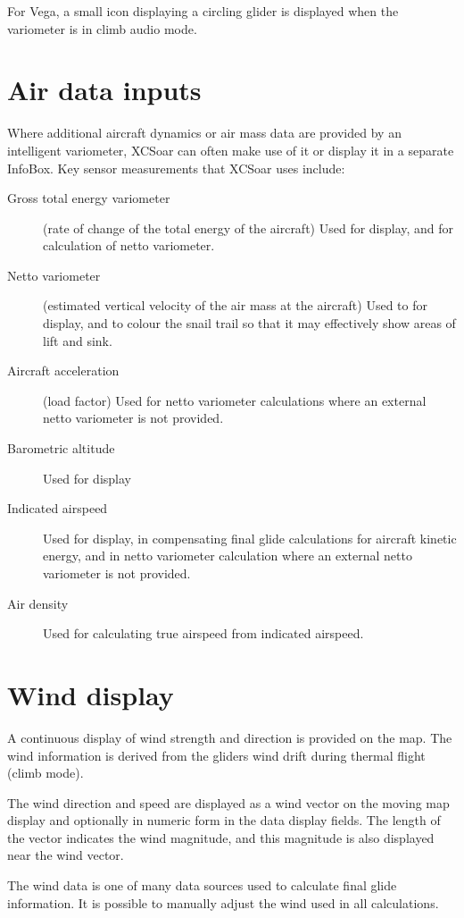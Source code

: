 \documentclass[a4paper,12pt]{refrep}
\begin{document}
For Vega, a small icon displaying a circling glider is displayed when
the variometer is in climb audio mode.

\section{Air data inputs}

Where additional aircraft dynamics or air mass data are provided by an
intelligent variometer, XCSoar can often make use of it or display it
in a separate InfoBox.  Key sensor measurements that XCSoar uses include:
\begin{description}
\item[Gross total energy variometer] (rate of change of the total energy of
 the aircraft)  Used for display, and for calculation of netto variometer.
\item[Netto variometer] (estimated vertical velocity of the air mass at
 the aircraft)  Used to for display, and to colour the snail trail
 so that it may effectively show areas of lift and sink.
\item[Aircraft acceleration] (load factor)  Used for netto variometer
  calculations where an external netto variometer is not provided.
\item[Barometric altitude] Used for display
\item[Indicated airspeed] Used for display, in compensating final glide
  calculations for aircraft kinetic energy, and in netto variometer
  calculation where an external netto variometer is not provided.
\item[Air density] Used for calculating true airspeed from indicated
  airspeed.
\end{description}

\section{Wind display}

A continuous display of wind strength and direction is provided on the
map.  The wind information is derived from the gliders wind drift
during thermal flight (climb mode).

The wind direction and speed are displayed as a wind vector on the
moving map display and optionally in numeric form in the data display
fields.  The length of the vector indicates the wind magnitude, and
this magnitude is also displayed near the wind vector.

The wind data is one of many data sources used to calculate final
glide information.  It is possible to manually adjust the wind used in
all calculations.
\end{document}
